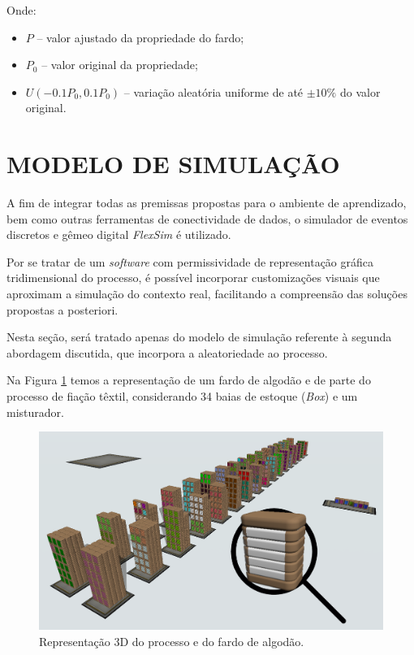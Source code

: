 \documentclass[
    12pt,                %
    openright,           %
    oneside,             %
    a4paper,             %
    english,             %
    spanish,             %
    brazil               %
]{ufscar}
\begin{document}
Onde:

\begin{itemize}
    \item \( P \) – valor ajustado da propriedade do fardo;
    \item \( P_0 \) – valor original da propriedade;
    \item \( U(-0.1 P_0, 0.1 P_0) \) – variação aleatória uniforme de até \( \pm 10\% \) do valor original.
\end{itemize}


\section{MODELO DE SIMULAÇÃO}

A fim de integrar todas as premissas propostas para o ambiente de aprendizado, bem como outras ferramentas de conectividade de dados, o simulador de eventos discretos e gêmeo digital \textit{FlexSim} é utilizado.

Por se tratar de um \textit{software} com permissividade de representação gráfica tridimensional do processo, é possível incorporar customizações visuais que aproximam a simulação do contexto real, facilitando a compreensão das soluções propostas a posteriori.

Nesta seção, será tratado apenas do modelo de simulação referente à segunda abordagem discutida, que incorpora a aleatoriedade ao processo. 

Na Figura \ref{figure:estoqueemisturador} temos a representação de um fardo de algodão e de parte do processo de fiação têxtil, considerando 34 baias de estoque (\textit{Box}) e um misturador.

\begin{figure}[hbt]
\centering
  \caption{Representação 3D do processo e do fardo de algodão.}
  \label{figure:estoqueemisturador}
  \includegraphics[width=1\textwidth]{figures/simulação.png}
\end{figure}
\end{document}
